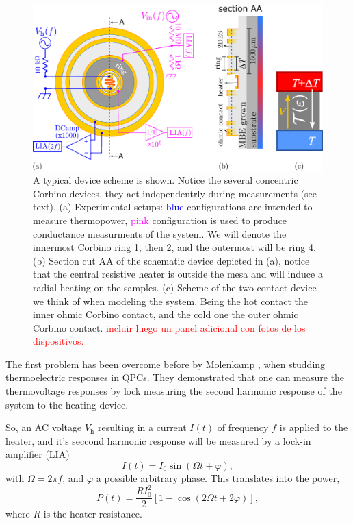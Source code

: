 \begin{figure}
    \includegraphics[width=1\textwidth]{figures/experimental/cobino_exp_arangement.pdf}
    \caption{A typical device scheme is shown. Notice the several concentric Corbino devices, they act independentrly during measurements (see text). (a) Experimental setups: \textcolor{blue}{blue} configurations are intended to measure thermopower, \textcolor{magenta}{pink} configuration is used to produce conductance measurments of the system. We will denote the innermost Corbino ring 1, then 2, and the outermost will be ring 4. (b) Section cut AA of the schematic device depicted in (a), notice that the central resistive heater is outside the mesa and will induce a radial heating on the samples. (c) Scheme of the two contact device we think of when modeling the system. Being the hot contact the inner ohmic Corbino contact, and the cold one the outer ohmic Corbino contact. \textcolor{red}{incluir luego un panel adicional con fotos de los dispositivos.}}
    \label{fig:corbino_exp_setup}
\end{figure}

The first problem has been overcome before by Molenkamp \etal \cite{molenkamp1993QPCthermal}, when studding thermoelectric responses in QPCs. They demonstrated that one can measure the thermovoltage responses by lock measuring the second harmonic response of the system to the heating device. 

So, an AC voltage $V_\text{h}$ resulting in a current $I(t)$ of frequency $f$ is applied to the heater, and it's seccond harmonic response will be measured by a lock-in amplifier (LIA)
\begin{equation}
    \label{eq:heater_current}
    I(t)=I_0\sin(\Omega t + \varphi), 
\end{equation}
with \( \Omega= 2\pi f \), and \( \varphi \) a possible arbitrary phase. This translates into the power,
\begin{equation}
    \label{eqs2}
    P(t)= \frac{R I_0^2}{2} \left[1- \cos(2 \Omega t + 2 \varphi) \right],
\end{equation}
where \(R \) is the heater resistance.


